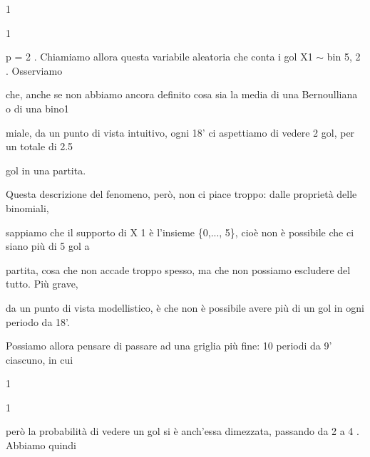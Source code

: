 \documentclass[a4paper,portrait,12pt]{article}
\begin{document}
1


1


\begin{flushleft}
p = 2 . Chiamiamo allora questa variabile aleatoria che conta i gol X1 $\sim$ bin 5, 2 . Osserviamo
\end{flushleft}


\begin{flushleft}
che, anche se non abbiamo ancora definito cosa sia la media di una Bernoulliana o di una bino1
\end{flushleft}


\begin{flushleft}
miale, da un punto di vista intuitivo, ogni 18' ci aspettiamo di vedere 2 gol, per un totale di 2.5
\end{flushleft}


\begin{flushleft}
gol in una partita.
\end{flushleft}


\begin{flushleft}
Questa descrizione del fenomeno, per\`{o}, non ci piace troppo: dalle propriet\`{a} delle binomiali,
\end{flushleft}


\begin{flushleft}
sappiamo che il supporto di X 1 \`{e} l'insieme \{0,..., 5\}, cio\`{e} non \`{e} possibile che ci siano più di 5 gol a
\end{flushleft}


\begin{flushleft}
partita, cosa che non accade troppo spesso, ma che non possiamo escludere del tutto. Più grave,
\end{flushleft}


\begin{flushleft}
da un punto di vista modellistico, \`{e} che non \`{e} possibile avere più di un gol in ogni periodo da 18'.
\end{flushleft}


\begin{flushleft}
Possiamo allora pensare di passare ad una griglia più fine: 10 periodi da 9' ciascuno, in cui
\end{flushleft}


1


1


\begin{flushleft}
per\`{o} la probabilit\`{a} di vedere un gol si \`{e} anch'essa dimezzata, passando da 2 a 4 . Abbiamo quindi
\end{flushleft}
\end{document}
